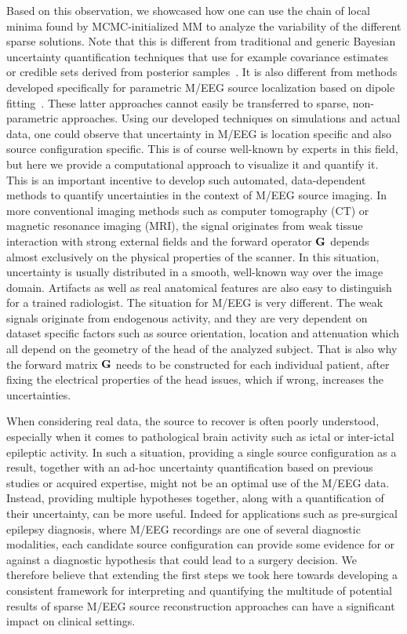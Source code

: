 Based on this observation, we showcased how one can use the chain of local minima found by MCMC-initialized MM to analyze the variability of the different sparse solutions. Note that this is different from traditional and generic Bayesian uncertainty quantification techniques that use for example covariance estimates or credible sets derived from posterior samples~\cite{szabo2015frequentist}. It is also different from methods developed specifically for parametric M/EEG source localization based on dipole fitting~\cite{Fuchs20041442,Darvas2005355}. These latter approaches cannot easily be transferred to sparse, non-parametric approaches. Using our developed techniques on simulations and actual data, one could observe that uncertainty in M/EEG is location specific and also source configuration specific. This is of course well-known by experts in this field, but here we provide a computational approach to visualize it and quantify it.
This is an important incentive to develop such automated, data-dependent methods to quantify uncertainties in the context of M/EEG source imaging. In more conventional imaging methods such as computer tomography (CT) or magnetic resonance imaging (MRI), the signal originates from weak tissue interaction with strong external fields and the forward operator $\mathbf{G}$ depends almost exclusively on the physical properties of the scanner. In this situation, uncertainty is usually distributed in a smooth, well-known way over the image domain. Artifacts as well as real anatomical features are also easy to distinguish for a trained radiologist. The situation for M/EEG is very different. The weak signals originate from endogenous activity, and they are very dependent on dataset specific factors such as source orientation, location and attenuation which all depend on the geometry of the head of the analyzed subject. That is also why the forward matrix $\mathbf{G}$ needs to be constructed for each individual patient, after fixing the electrical properties of the head issues, which if wrong, increases the uncertainties.

When considering real data, the source to recover is often poorly understood, especially when it comes to pathological brain activity such as ictal or inter-ictal epileptic activity. In such a situation, providing a single source configuration as a result, together with an ad-hoc uncertainty quantification based on previous studies or acquired expertise, might not be an optimal use of the M/EEG data.
Instead, providing multiple hypotheses together, along with a quantification of their uncertainty, can be more useful. Indeed for applications such as pre-surgical epilepsy diagnosis, where M/EEG recordings are one of several diagnostic modalities, each candidate source configuration can provide some evidence for or against a diagnostic hypothesis that could lead to a surgery decision.
We therefore believe that extending the first steps we took here towards developing a consistent framework for interpreting and quantifying the multitude of potential results of sparse M/EEG source reconstruction approaches can have a significant impact on clinical settings.
